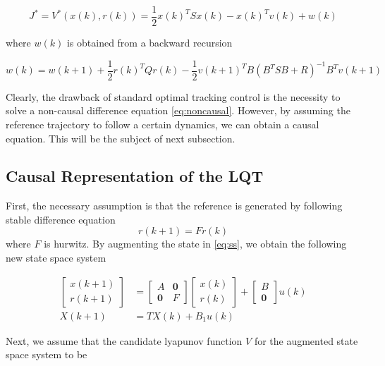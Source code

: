\begin{equation}
J^* = V^*(x(k), r(k)) = \frac{1}{2}x(k)^TSx(k) - x(k)^Tv(k) + w(k)
\end{equation}

where $ w(k) $ is obtained from a backward recursion

\begin{equation}
w(k) = w(k+1) + \frac{1}{2}r(k)^TQr(k) - \frac{1}{2}v(k+1)^TB(B^TSB+R)^{-1}B^Tv(k+1)
\end{equation}

Clearly, the drawback of standard optimal tracking control is the necessity to solve a non-causal difference equation \eqref{eq:noncausal}. However, by assuming the reference trajectory to follow a certain dynamics, we can obtain a causal equation. This will be the subject of next subsection.

\subsection{Causal Representation of the LQT}
First, the necessary assumption is that the reference is generated by following stable difference equation
\begin{equation}
r(k+1) = Fr(k) 
\end{equation}
where $ F $ is hurwitz. By augmenting the state in \eqref{eq:ss}, we obtain the following new state space system

\begin{equation}
\begin{split}
\left[ \begin{array}{c}
x(k+1) \\ 
r(k+1)
\end{array} \right] &= \left[\begin{array}{cc}
A & \textbf{0} \\ 
\textbf{0} & F
\end{array}  \right] \left[ \begin{array}{c}
x(k) \\ 
r(k)
\end{array} \right] + \left[ \begin{array}{c}
B \\ 
\textbf{0}
\end{array} \right] u(k) \\
X(k+1) &= TX(k) + B_1u(k)
\end{split}
\end{equation}

Next, we assume that the candidate lyapunov function $V$ for the augmented state space system to be

